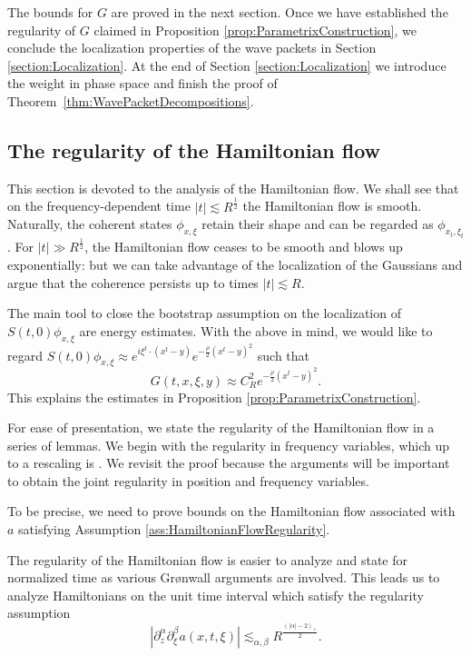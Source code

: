 \documentclass{amsart}
\theoremstyle{definition}
\begin{document}
The bounds for $G$ are proved in the next section.  Once we have established the regularity of $G$ claimed in Proposition \ref{prop:ParametrixConstruction}, we conclude the localization properties of the wave packets in Section \ref{section:Localization}. At the end of Section \ref{section:Localization} we introduce the weight in phase space and finish the proof of Theorem~\ref{thm:WavePacketDecompositions}.



\subsection{The regularity of the Hamiltonian flow}
\label{section:RegularityFlow}
This section is devoted to the analysis of the Hamiltonian flow. We shall see that on the frequency-dependent time $|t| \lesssim R^{\frac{1}{2}}$ the Hamiltonian flow is smooth. Naturally, the coherent states $\phi_{x,\xi}$ retain their shape and can be regarded as $\phi_{x_t,\xi_t}$. For $|t| \gg R^{\frac{1}{2}}$, the Hamiltonian flow ceases to be smooth and blows up exponentially: but we can take advantage of the localization of the Gaussians and argue that the coherence persists up to times $|t| \lesssim R$. 

The main tool to close the bootstrap assumption on the localization of $S(t,0) \phi_{x,\xi}$ are energy estimates. With the above in mind, we would like to regard $S(t,0) \phi_{x,\xi} \approx e^{i \xi^t \cdot (x^t - y)} e^{- \frac{\rho}{2}(x^t - y)^2}$ such that
\begin{equation*}
G(t,x,\xi,y) \approx C_R^2 e^{- \frac{\rho}{2}(x^t - y)^2}.
\end{equation*}
This explains the estimates in Proposition \ref{prop:ParametrixConstruction}.

For ease of presentation, we state the regularity of the Hamiltonian flow in a series of lemmas. We begin with the regularity in frequency variables, which up to a rescaling is \cite[Lemma~9]{Tataru2002}. We revisit the proof because the arguments will be important to obtain the joint regularity in position and frequency variables.

To be precise, we need to prove bounds on the Hamiltonian flow associated with $a$ satisfying Assumption \ref{ass:HamiltonianFlowRegularity}.

\smallskip

The regularity of the Hamiltonian flow is easier to analyze and state for normalized time as various Gr\o nwall arguments are involved. This leads us to analyze Hamiltonians on the unit time interval which satisfy the regularity assumption
\begin{equation}
\label{eq:BoundHamiltonSymbol}
|\partial_{z}^{\alpha} \partial_{\xi}^{\beta} a(x,t,\xi) | \lesssim_{\alpha,\beta} R^{\frac{(|\alpha|-2)_+}{2}}.
\end{equation}
\end{document}
